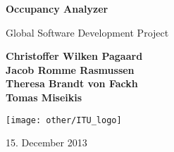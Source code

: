 \begin{titlepage}
	\begin{center}
		\vspace*{1cm}
		
		\Huge
		\textbf{Occupancy Analyzer}
		
		\vspace{0.5cm}
		\LARGE
		Global Software Development Project
		
		\vspace{1.5cm}
		
		\textbf{
			Christoffer Wilken Pagaard\\
			Jacob Romme Rasmussen\\
			Theresa Brandt von Fackh\\
			Tomas Miseikis\\
		}
		
		\vfill
		
		\vspace{0.8cm}
		
		\texttt{[image: other/ITU\_logo]}
		
		\Large
		15. December 2013
		
	\end{center}
\end{titlepage}